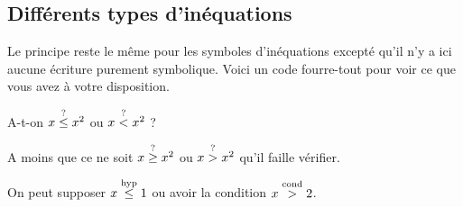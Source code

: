 \documentclass[12pt,a4paper]{article}
\begin{document}
    \subsection{Différents types d'inéquations}
    
Le principe reste le même pour les symboles d'inéquations excepté qu'il n'y a ici aucune écriture purement symbolique. Voici un code \og fourre-tout \fg{} pour voir ce que vous avez à votre disposition.

\begin{tcblisting}{}
A-t-on $x \leqtest x^2$ ou $x \ltest x^2$ ?

A moins que ce ne soit $x \geqtest x^2$ ou $x \gtest x^2$ qu'il faille vérifier.

On peut supposer $x \leqhyp 1$ ou avoir la condition $x \gcond 2$.

\end{tcblisting}
\end{document}
